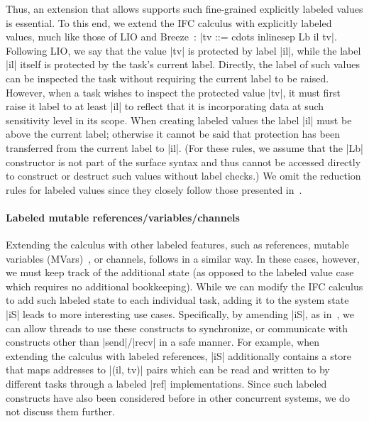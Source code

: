 Thus, an extension that allows supports such fine-grained explicitly
labeled values is essential.
%
To this end, we extend the IFC calculus with explicitly labeled
values, much like those of LIO and
Breeze~\cite{lio, Hritcu:2013:YIB:2497621.2498098}: |tv ::= cdots
inlinesep Lb il tv|.
%
Following LIO, we say that the value |tv| is protected by label |il|,
while the label |il| itself is protected by the task's current label.
%
%
Directly, the label of such values can be inspected the task without
requiring the current label to be raised.
%
However, when a task wishes to inspect the protected value |tv|, it
must first raise it label to at least |il| to reflect that it is
incorporating data at such sensitivity level in its scope.
%
When creating labeled values the label |il| must be above
the current label; otherwise it cannot be said that protection has
been transferred from the current label to |il|.
%
(For these rules, we assume that the |Lb| constructor is not part of
the surface syntax and thus cannot be accessed directly to construct
or destruct such values without label checks.)
% 
We omit the reduction rules for labeled values since they closely
follow those presented in~\cite{lio}.

\paragraph{Labeled mutable references/variables/channels}
%
Extending the calculus with other labeled features, such as
references, mutable variables (MVars)~\cite{CH96}, or channels,
follows in a similar way.
%
In these cases, however, we must keep track of the additional state
(as opposed to the labeled value case which requires no additional
bookkeeping).
%
While we can modify the IFC calculus to add such labeled state to each
individual task, adding it to the system state |iS| leads to more
interesting use cases.
%
Specifically, by amending |iS|, as in~\cite{lio,
stefan:addressing-covert}, we can allow threads to use these
constructs to synchronize, or communicate with constructs other than
|send|/|recv| in a safe manner.
%
For example, when extending the calculus with labeled references, |iS|
additionally contains a store that maps addresses to |(il, tv)| pairs
which can be read and written to by different tasks through a labeled
|ref| implementations.
%
Since such labeled constructs have also been considered before in other
concurrent systems, we do not discuss them further.

